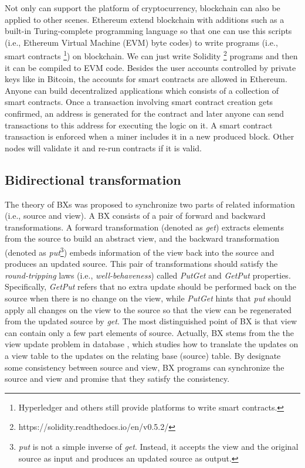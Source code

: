 \documentclass[conference]{IEEEtran}
\begin{document}
	Not only can support the platform of cryptocurrency, blockchain can also be applied to other scenes. Ethereum \cite{wood2014ethereum} extend blockchain with additions such as a built-in Turing-complete programming language so that one can use this scripts (i.e., Ethereum Virtual Machine (EVM) byte codes) to write programs (i.e., smart contracts \footnote{Hyperledger and others still provide platforms to write smart contracts.}) on blockchain. We can just write Solidity \footnote{https://solidity.readthedocs.io/en/v0.5.2/} programs and then it can be compiled to EVM code. Besides the user accounts controlled by private keys like in Bitcoin, the accounts for smart contracts are allowed in Ethereum. Anyone can build decentralized applications which consists of a collection of smart contracts. Once a transaction involving smart contract creation gets confirmed, an address is generated for the contract and later anyone can send transactions to this address for executing the logic on it. A smart contract transaction is enforced when a miner includes it in a new produced block. Other nodes will validate it and re-run contracts if it is valid.
	
	\subsection{Bidirectional transformation}
	The theory of BXs was proposed to synchronize two parts of related information (i.e., source and view).  A BX consists of a pair of forward and backward transformations. A forward transformation (denoted as \emph{get}) extracts elements from the source to build an abstract view, and the backward transformation (denoted as \emph{put}\footnote{\emph{put} is not a simple inverse of \emph{get}. Instead, it accepts the view and the original source as input and produces an updated source as output.}) embeds information of the view back into the source and produces an updated source. This pair of transformations should satisfy the {\em round-tripping} laws (i.e., {\em well-behaveness}) called \emph{PutGet} and \emph{GetPut} properties. Specifically, \emph{GetPut} refers that no extra update should be performed back on the source when there is no change on the view, while \emph{PutGet} hints that \emph{put} should apply all changes on the view to the source so that the view can be regenerated from the updated source by \emph{get}. The most distinguished point of BX is that view can contain only a few part elements of source. Actually, BX stems from the the view update problem in database \cite{bancilhon1981update}, which studies how to translate the updates on a view table to the updates on the relating base (source) table. By designate some consistency between source and view, BX programs can synchronize the source and view and promise that they satisfy the consistency.
	
\end{document}
